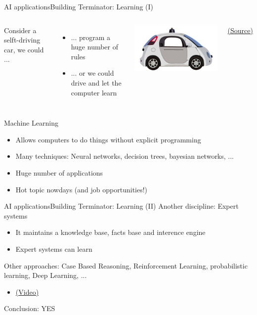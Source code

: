 \documentclass[10pt,compress]{beamer} %
\begin{document}
\begin{frame}{AI applications}{Building Terminator: Learning (I)}
	\begin{columns}
			Consider a selft-driving car, we could ...
			\begin{itemize}
				\item ... program a huge number of rules
				\item ... or we could drive and let the computer learn
			\end{itemize}
			\includegraphics[width=\linewidth]{figs/car.png}\\
			\vspace{-0.2cm}
			\begin{center}
			\tiny{\href{http://www.national.co.uk/tech-powers-google-car/}{(Source)}}
			\end{center}
	\end{columns}

	Machine Learning
	\begin{itemize}
		\item Allows computers to do things without explicit programming
		\item Many techniques: Neural networks, decision trees, bayesian networks, ...
		\item Huge number of applications
		\item Hot topic nowdays (and job opportunities!)
	\end{itemize}
	
\end{frame}

\begin{frame}{AI applications}{Building Terminator: Learning (II)}
	Another discipline: Expert systems
	\begin{itemize}
		\item It maintains a knowledge base, facts base and interence engine
		\item Expert systems can learn
	\end{itemize}
	Other approaches: Case Based Reasoning, Reinforcement Learning, probabilistic learning, Deep Learning, ...
	\begin{itemize}
		\item \href{https://www.youtube.com/watch?v=W_gxLKSsSIE}{(Video)}
	\end{itemize}
	Conclusion: YES
\end{frame}
\end{document}
